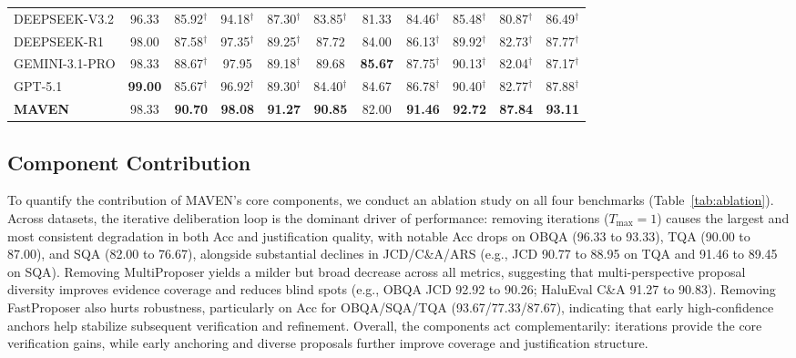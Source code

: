 \documentclass{article}
\begin{document}
\begin{table}[t]
\begin{tabular}{l ccccc ccccc}
\midrule
DEEPSEEK-V3.2 & 96.33 & 85.92$^\dagger$ & 94.18$^\dagger$ & 87.30$^\dagger$ & 83.85$^\dagger$ & 81.33 & 84.46$^\dagger$ & 85.48$^\dagger$ & 80.87$^\dagger$ & 86.49$^\dagger$ \\
DEEPSEEK-R1 & 98.00 & 87.58$^\dagger$ & 97.35$^\dagger$ & 89.25$^\dagger$ & 87.72 & 84.00 & 86.13$^\dagger$ & 89.92$^\dagger$ & 82.73$^\dagger$ & 87.77$^\dagger$ \\
GEMINI-3.1-PRO & 98.33 & 88.67$^\dagger$ & 97.95 & 89.18$^\dagger$ & 89.68 & \textbf{85.67} & 87.75$^\dagger$ & 90.13$^\dagger$ & 82.04$^\dagger$ & 87.17$^\dagger$ \\
GPT-5.1 & \textbf{99.00} & 85.67$^\dagger$ & 96.92$^\dagger$ & 89.30$^\dagger$ & 84.40$^\dagger$ & 84.67 & 86.78$^\dagger$ & 90.40$^\dagger$ & 82.77$^\dagger$ & 87.88$^\dagger$ \\

\midrule
\textbf{MAVEN} & 98.33 & \textbf{90.70} & \textbf{98.08} & \textbf{91.27} & \textbf{90.85} & 82.00 & \textbf{91.46} & \textbf{92.72} & \textbf{87.84} & \textbf{93.11} \\

\bottomrule
\end{tabular}
\end{table}

\subsection{Component Contribution}

To quantify the contribution of MAVEN’s core components, we conduct an ablation study on all four benchmarks (Table~\ref{tab:ablation}). Across datasets, the iterative deliberation loop is the dominant driver of performance: removing iterations ($T_{\max}=1$) causes the largest and most consistent degradation in both Acc and justification quality, with notable Acc drops on OBQA (96.33 to 93.33), TQA (90.00 to 87.00), and SQA (82.00 to 76.67), alongside substantial declines in JCD/C\&A/ARS (e.g., JCD 90.77 to 88.95 on TQA and 91.46 to 89.45 on SQA). Removing MultiProposer yields a milder but broad decrease across all metrics, suggesting that multi-perspective proposal diversity improves evidence coverage and reduces blind spots (e.g., OBQA JCD 92.92 to 90.26; HaluEval C\&A 91.27 to 90.83). Removing FastProposer also hurts robustness, particularly on Acc for OBQA/SQA/TQA (93.67/77.33/87.67), indicating that early high-confidence anchors help stabilize subsequent verification and refinement. Overall, the components act complementarily: iterations provide the core verification gains, while early anchoring and diverse proposals further improve coverage and justification structure.
\end{document}
